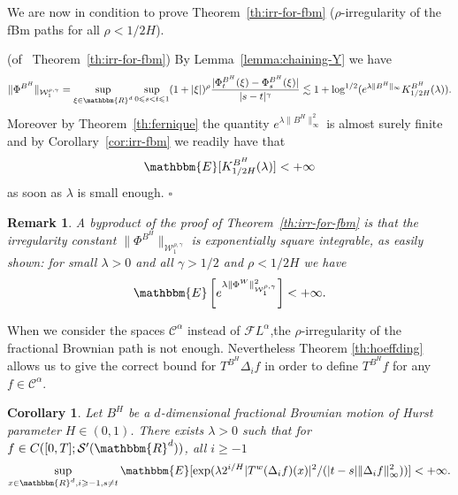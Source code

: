 \documentclass[a4paper,11pt]{article}
\newtheorem{corollary}[theorem]{Corollary}
\newtheorem{remark}[theorem]{Remark}
\newenvironment{proof}{{\sc Proof.}}{\hfill$\square$}
\newcommand{\CC}{\mathscr C}
\newcommand{\CF}{\mathscr F}
\begin{document}
We are now in condition to prove Theorem~\ref{th:irr-for-fbm}
($\rho$-irregularity of the fBm paths for all $\rho <1/2H$).

\begin{proof}
  (of \ Theorem~\ref{th:irr-for-fbm}) By Lemma~\ref{lemma:chaining-Y} we have
  \[ \| \Phi^{B^{H}} \|_{\mathcal{W}^{\rho , \gamma}_{1}} = \sup_{\xi \in
     \mathbbm{R}^{d}}   \sup_{0 \leqslant s<t \leqslant 1} ( 1+ | \xi |
     )^{\rho} \frac{| \Phi^{B^{H}}_{t} ( \xi )- \Phi^{B^{H}}_{s} ( \xi
     )|}{|s-t|^{\gamma}} \lesssim 1+ \log^{1/2} ( e^{\lambda \| B^{H}
     \|_{\infty}} K^{B^{H}}_{1/2H} ( \lambda ) ) . \]
  Moreover by Theorem~\ref{th:fernique} the quantity $e^{\lambda \| B^{H}
  \|_{\infty}^{2}}$ is almost surely finite and by Corollary~\ref{cor:irr-fbm}
  we readily have that
  \[ \mathbbm{E} [K^{B^{H}}_{1/2H} ( \lambda ) ] <+ \infty \]
  as soon as $\lambda$ is small enough.
\end{proof}

\begin{remark}
  A byproduct of the proof of Theorem~\ref{th:irr-for-fbm} is that the
  irregularity constant $\| \Phi^{B^{H}} \|_{\mathcal{W}^{\rho , \gamma}_{1}}$
  is exponentially square integrable, as easily shown: for small $\lambda >0$
  and all $\gamma >1/2$ and $\rho <1/2H$ we have
  \[ \mathbbm{E} \left[ e^{\lambda \| \Phi^{W} \|^{2}_{\mathcal{W}^{\rho ,
     \gamma}_{1}}} \right] <+ \infty . \]
\end{remark}

When we consider the spaces $\CC^{\alpha}$ instead of $\CF L^{\alpha}$,the
$\rho$-irregularity of the fractional Brownian path is not enough.
Nevertheless Theorem \ref{th:hoeffding} allows us to give the correct bound
for $T^{B^{H}} \Delta_{i} f$ in order to define $T^{B^{H}} f$ for any $f \in
\CC^{\alpha}$.

\begin{corollary}
  Let $B^{H}$ be a $d$-dimensional fractional Brownian motion of Hurst parameter
  $H \in ( 0,1 )$. There exists $\lambda >0$ such that for $f \in C ( [ 0,T ]
  ;\mathcal{S}' ( \mathbbm{R}^{d} ) )$, all $i \geqslant -1$
  \[ \sup_{x \in \mathbbm{R}^{d} ,i \geqslant -1,s \neq t} \mathbbm{E} [ \exp
     ( \lambda 2^{i/H} | T^{w} ( \Delta_{i} f ) ( x ) |^{2} / ( | t-s | \|
     \Delta_{i} f \|_{\infty}^{2} ) ) ] <+ \infty. \]
\end{corollary}
\end{document}
